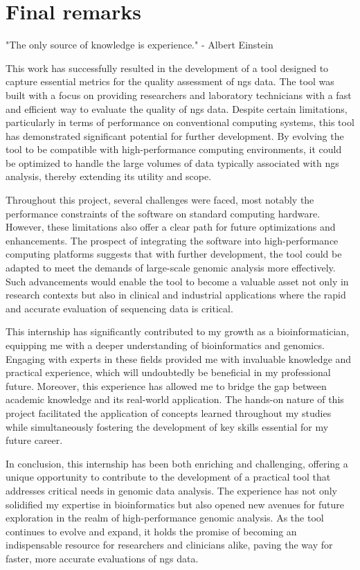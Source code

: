 \chapter{Final remarks}
\label{chapter:Final remarks}

\begin{introduction}
    "The only source of knowledge is experience." - Albert Einstein
\end{introduction}


This work has successfully resulted in the development of a tool designed to capture essential metrics for the quality assessment of \ac{ngs} data. The tool was built with a focus on providing researchers and laboratory technicians with a fast and efficient way to evaluate the quality of \ac{ngs} data. Despite certain limitations, particularly in terms of performance on conventional computing systems, this tool has demonstrated significant potential for further development. By evolving the tool to be compatible with high-performance computing environments, it could be optimized to handle the large volumes of data typically associated with \ac{ngs} analysis, thereby extending its utility and scope.

Throughout this project, several challenges were faced, most notably the performance constraints of the software on standard computing hardware. However, these limitations also offer a clear path for future optimizations and enhancements. The prospect of integrating the software into high-performance computing platforms suggests that with further development, the tool could be adapted to meet the demands of large-scale genomic analysis more effectively. Such advancements would enable the tool to become a valuable asset not only in research contexts but also in clinical and industrial applications where the rapid and accurate evaluation of sequencing data is critical.

This internship has significantly contributed to my growth as a bioinformatician, equipping me with a deeper understanding of bioinformatics and genomics. Engaging with experts in these fields provided me with invaluable knowledge and practical experience, which will undoubtedly be beneficial in my professional future. Moreover, this experience has allowed me to bridge the gap between academic knowledge and its real-world application. The hands-on nature of this project facilitated the application of concepts learned throughout my studies while simultaneously fostering the development of key skills essential for my future career.

In conclusion, this internship has been both enriching and challenging, offering a unique opportunity to contribute to the development of a practical tool that addresses critical needs in genomic data analysis. The experience has not only solidified my expertise in bioinformatics but also opened new avenues for future exploration in the realm of high-performance genomic analysis. As the tool continues to evolve and expand, it holds the promise of becoming an indispensable resource for researchers and clinicians alike, paving the way for faster, more accurate evaluations of \ac{ngs} data.
